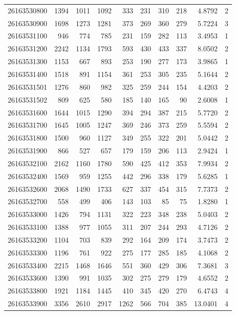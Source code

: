 \documentclass[11pt,landscape]{article}
\begin{document}
{\begin{longtable}[]{@{}lrrrrrrrrr@{}}
26163530800 & 1394 & 1011 & 1092 & 333 & 231 & 310 & 218 & 4.8792 & 2 \\
26163530900 & 1698 & 1273 & 1281 & 373 & 269 & 360 & 279 & 5.7224 & 3 \\
26163531100 & 946 & 774 & 785 & 231 & 159 & 282 & 113 & 3.4953 & 1 \\
26163531200 & 2242 & 1134 & 1793 & 593 & 430 & 433 & 337 & 8.0502 & 2 \\
26163531300 & 1153 & 667 & 893 & 253 & 190 & 277 & 173 & 3.9865 & 1 \\
26163531400 & 1518 & 891 & 1154 & 361 & 253 & 305 & 235 & 5.1644 & 2 \\
26163531501 & 1276 & 860 & 982 & 325 & 259 & 244 & 154 & 4.4203 & 2 \\
26163531502 & 809 & 625 & 580 & 185 & 140 & 165 & 90 & 2.6008 & 1 \\
26163531600 & 1644 & 1015 & 1290 & 394 & 294 & 387 & 215 & 5.7720 & 2 \\
26163531700 & 1645 & 1005 & 1247 & 369 & 246 & 373 & 259 & 5.5594 & 2 \\
26163531800 & 1500 & 960 & 1127 & 349 & 255 & 322 & 201 & 5.0442 & 2 \\
26163531900 & 866 & 527 & 657 & 179 & 159 & 206 & 113 & 2.9424 & 1 \\
26163532100 & 2162 & 1160 & 1780 & 590 & 425 & 412 & 353 & 7.9934 & 2 \\
26163532400 & 1569 & 959 & 1255 & 442 & 296 & 338 & 179 & 5.6285 & 1 \\
26163532600 & 2068 & 1490 & 1733 & 627 & 337 & 454 & 315 & 7.7373 & 2 \\
26163532700 & 558 & 499 & 406 & 143 & 103 & 85 & 75 & 1.8280 & 1 \\
26163533000 & 1426 & 794 & 1131 & 322 & 223 & 348 & 238 & 5.0403 & 2 \\
26163533100 & 1388 & 977 & 1055 & 311 & 207 & 244 & 293 & 4.7126 & 2 \\
26163533200 & 1104 & 703 & 839 & 292 & 164 & 209 & 174 & 3.7473 & 2 \\
26163533300 & 1196 & 761 & 922 & 275 & 177 & 285 & 185 & 4.1068 & 2 \\
26163533400 & 2215 & 1468 & 1646 & 551 & 360 & 429 & 306 & 7.3681 & 3 \\
26163533600 & 1390 & 991 & 1035 & 302 & 275 & 279 & 179 & 4.6552 & 2 \\
26163533800 & 1921 & 1184 & 1445 & 410 & 345 & 420 & 270 & 6.4743 & 4 \\
26163533900 & 3356 & 2610 & 2917 & 1262 & 566 & 704 & 385 & 13.0401 & 4 \\

\end{longtable}}
\end{document}
